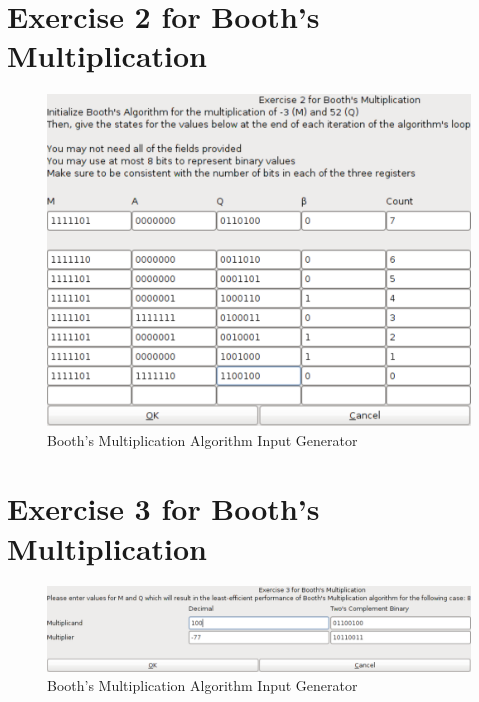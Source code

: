 \documentclass{article}
\begin{document}
\pagebreak

\section{Exercise 2 for Booth's Multiplication}
\begin{figure}[h]
\centering
\includegraphics[scale=0.3]{ex2ingen.pdf}
\caption{Booth's Multiplication Algorithm Input Generator}
\end{figure}

\pagebreak

\section{Exercise 3 for Booth's Multiplication}
\begin{figure}[h]
\centering
\includegraphics[scale=0.3]{ex3ingen.pdf}
\caption{Booth's Multiplication Algorithm Input Generator}
\end{figure}
\end{document}
